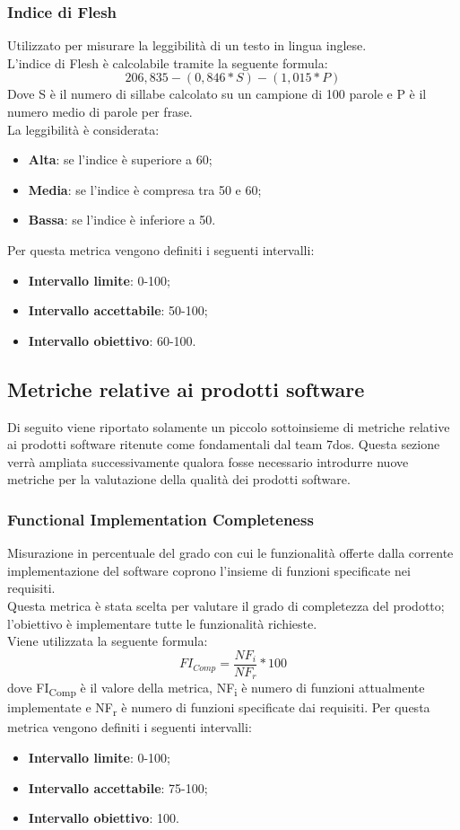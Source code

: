 \subsubsection{Indice di Flesh}
Utilizzato per misurare la leggibilità di un testo in lingua inglese.\\
L'indice di Flesh è calcolabile tramite la seguente formula:
	$$
		206,835-(0,846*S)-(1,015*P)
	$$
Dove S è il numero di sillabe calcolato su un campione di 100 parole e P è il numero medio di parole per frase.\\
La leggibilità è considerata:
	\begin{itemize}
		\item{\textbf{Alta}}: se l'indice è superiore a 60;
		\item{\textbf{Media}}: se l'indice è compresa tra 50 e 60;
		\item{\textbf{Bassa}}: se l'indice è inferiore a 50.
	\end{itemize}
Per questa metrica vengono definiti i seguenti intervalli: 
\begin{itemize}
	\item{\textbf{Intervallo limite}: 0-100;}
	\item{\textbf{Intervallo accettabile}: 50-100;}
	\item{\textbf{Intervallo obiettivo}: 60-100.}
\end{itemize} 
\subsection{Metriche relative ai prodotti software}
Di seguito viene riportato solamente un piccolo sottoinsieme di metriche relative ai prodotti software ritenute come fondamentali dal team 7dos.
Questa sezione verrà ampliata successivamente qualora fosse necessario introdurre nuove metriche per la valutazione della qualità dei prodotti software. 
\subsubsection{Functional Implementation Completeness}
Misurazione in percentuale del grado con cui le funzionalità offerte dalla corrente implementazione del software coprono l'insieme di funzioni specificate nei requisiti.\\
Questa metrica è stata scelta per valutare il grado di completezza del prodotto; l'obiettivo è implementare tutte le funzionalità richieste.\\
Viene utilizzata la seguente formula:
$$FI_{Comp}=\frac{NF_i}{NF_r}*100$$
dove FI\textsubscript{Comp} è il valore della metrica, NF\textsubscript{i} è numero di funzioni attualmente implementate e NF\textsubscript{r} è numero di funzioni specificate dai requisiti.
Per questa metrica vengono definiti i seguenti intervalli: 
\begin{itemize}
	\item{\textbf{Intervallo limite}: 0-100;}
	\item{\textbf{Intervallo accettabile}: 75-100;}
	\item{\textbf{Intervallo obiettivo}: 100.}
\end{itemize}

